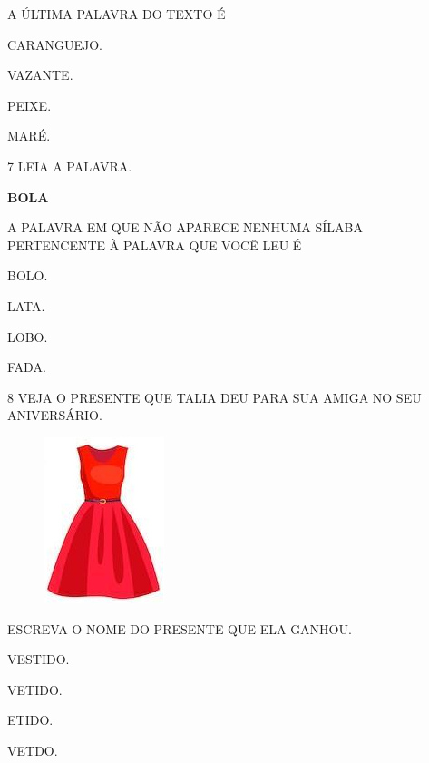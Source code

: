 A ÚLTIMA PALAVRA DO TEXTO É

\begin{escolha}
\item CARANGUEJO.

\item VAZANTE.

\item PEIXE.

\item MARÉ.
\end{escolha}

\num{7} LEIA A PALAVRA.

\begin{myquote}
\textbf{BOLA}
\end{myquote}

A PALAVRA EM QUE NÃO APARECE NENHUMA SÍLABA PERTENCENTE À PALAVRA QUE VOCÊ LEU É 

\begin{escolha}
\item BOLO.

\item LATA.

\item LOBO.

\item FADA.
\end{escolha}

\pagebreak
\num{8} VEJA O PRESENTE QUE TALIA DEU PARA SUA AMIGA NO SEU ANIVERSÁRIO.

\begin{figure}[htpb]
\centering
\includegraphics[width=.25\textwidth]{media/image232.jpg}
\end{figure}

ESCREVA O NOME DO PRESENTE QUE ELA GANHOU.

\begin{escolha}
\item VESTIDO.

\item VETIDO.

\item ETIDO.

\item VETDO.
\end{escolha}

